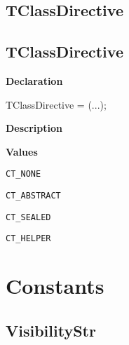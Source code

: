 \documentclass{report}
\newif\ifpdf
\begin{document}
\subsection*{\large{\textbf{TClassDirective}}\normalsize\hspace{1ex}\hrulefill}
\else
\subsection*{TClassDirective}
\fi
\label{PasDoc_Items-TClassDirective}
\begin{list}{}{
\setlength{\itemindent}{0cm}
\setlength{\listparindent}{0cm}
\setlength{\leftmargin}{\evensidemargin}
\addtolength{\leftmargin}{\tmplength}
\settowidth{\labelsep}{X}
\addtolength{\leftmargin}{\labelsep}
\setlength{\labelwidth}{\tmplength}
}
\item[\textbf{Declaration}\hfill]
\ifpdf
\begin{flushleft}
\fi
\begin{ttfamily}
TClassDirective = (...);\end{ttfamily}

\ifpdf
\end{flushleft}
\fi

\par
\item[\textbf{Description}]
 \item[\textbf{Values}]
\begin{description}
\item[\texttt{CT{\_}NONE}] \label{PasDoc_Items-CT_NONE}
\index{}
 
\item[\texttt{CT{\_}ABSTRACT}] \label{PasDoc_Items-CT_ABSTRACT}
\index{}
 
\item[\texttt{CT{\_}SEALED}] \label{PasDoc_Items-CT_SEALED}
\index{}
 
\item[\texttt{CT{\_}HELPER}] \label{PasDoc_Items-CT_HELPER}
\index{}
 
\end{description}


\end{list}
\section{Constants}
\ifpdf
\subsection*{\large{\textbf{VisibilityStr}}\normalsize\hspace{1ex}\hrulefill}
\else
\end{document}
